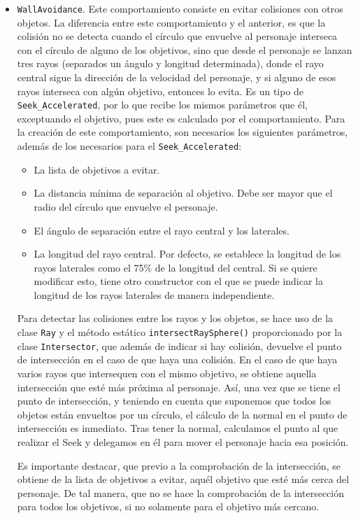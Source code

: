 \begin{itemize}
 \item \texttt{WallAvoidance}. Este comportamiento consiste en evitar colisiones con otros objetos. La diferencia entre este comportamiento y el anterior, es que la colisión no se detecta cuando el círculo que envuelve al personaje interseca con el círculo de alguno de los objetivos, sino que desde el personaje se lanzan tres rayos (separados un ángulo y longitud determinada), donde el rayo central sigue la dirección de la velocidad del personaje, y si alguno de esos rayos interseca con algún objetivo, entonces lo evita. Es un tipo de \texttt{Seek\_Accelerated}, por lo que recibe los mismos parámetros que él, exceptuando el objetivo, pues este es calculado por el comportamiento. Para la creación de este comportamiento, son necesarios los siguientes parámetros, además de los necesarios para el \texttt{Seek\_Accelerated}:
 \begin{itemize}
  \item La lista de objetivos a evitar.
  \item La distancia mínima de separación al objetivo. Debe ser mayor que el radio del círculo que envuelve el personaje.
  \item El ángulo de separación entre el rayo central y los laterales.
  \item La longitud del rayo central. Por defecto, se establece la longitud de los rayos laterales como el 75\% de la longitud del central. Si se quiere modificar esto, tiene otro constructor con el que se puede indicar la longitud de los rayos laterales de manera independiente.
 \end{itemize}
 Para detectar las colisiones entre los rayos y los objetos, se hace uso de la clase \texttt{Ray} y el método estático \texttt{intersectRaySphere()} proporcionado por la clase \texttt{Intersector}, que además de indicar si hay colisión, devuelve el punto de intersección en el caso de que haya una colisión. En el caso de que haya varios rayos que intersequen con el mismo objetivo, se obtiene aquella intersección que esté más próxima al personaje. Así, una vez que se tiene el punto de intersección, y teniendo en cuenta que suponemos que todos los objetos están envueltos por un círculo, el cálculo de la normal en el punto de intersección es inmediato. Tras tener la normal, calculamos el punto al que realizar el Seek y delegamos en él para mover el personaje hacia esa posición.
 
 Es importante destacar, que previo a la comprobación de la intersección, se obtiene de la lista de objetivos a evitar, aquél objetivo que esté más cerca del personaje. De tal manera, que no se hace la comprobación de la intersección para todos los objetivos, si no solamente para el objetivo más cercano. 
 

\end{itemize}
